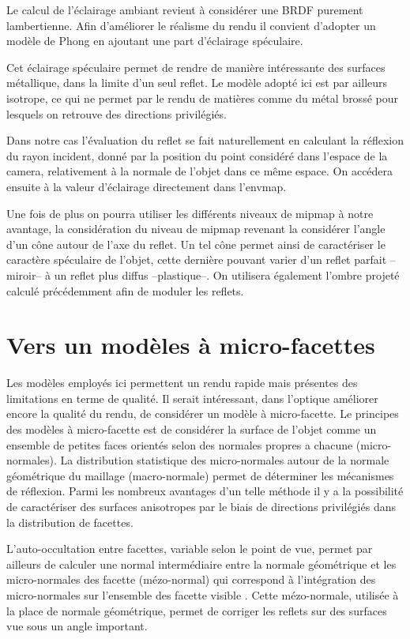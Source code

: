 \documentclass[10pt,a4paper,twoside, twocolumn]{report}
\begin{document}
Le calcul de l'éclairage ambiant revient à considérer une BRDF purement lambertienne. Afin d'améliorer le réalisme du rendu il convient d'adopter un modèle de Phong en ajoutant une part d'éclairage spéculaire.

Cet éclairage spéculaire permet de rendre de manière intéressante des surfaces métallique, dans la limite d'un seul reflet. Le modèle adopté ici est par ailleurs isotrope, ce qui ne permet par le rendu de matières comme du métal brossé pour lesquels on retrouve des directions privilégiés.

Dans notre cas l'évaluation du reflet se fait naturellement en calculant la réflexion du rayon incident, donné par la position du point considéré dans l'espace de la camera, relativement à la normale de l'objet dans ce même espace. On accédera ensuite à la valeur d'éclairage directement dans l'envmap.

Une fois de plus on pourra utiliser les différents niveaux de mipmap à notre avantage, la considération du niveau de mipmap revenant la considérer l'angle d'un cône autour de l'axe du reflet. Un tel cône permet ainsi de caractériser le caractère spéculaire de l'objet, cette dernière pouvant varier d'un reflet parfait --miroir-- à un reflet plus diffus --plastique--.
On utilisera également l'ombre projeté calculé précédemment afin de moduler les reflets.


\section{Vers un modèles à micro-facettes}

Les modèles employés ici permettent un rendu rapide mais présentes des limitations en terme de qualité. Il serait intéressant, dans l'optique améliorer encore la qualité du rendu, de considérer un modèle à micro-facette. 
Le principes des modèles à micro-facette est de considérer la surface de l'objet comme un ensemble de petites faces orientés selon des normales propres a chacune (micro-normales). La distribution statistique des micro-normales autour de la normale géométrique du maillage (macro-normale) permet de déterminer les mécanismes de réflexion. Parmi les nombreux avantages d'un telle méthode il y a la possibilité de caractériser des surfaces anisotropes par le biais de directions privilégiés dans la distribution de facettes.

L'auto-occultation entre facettes, variable selon le point de vue, permet par ailleurs de calculer une normal intermédiaire entre la normale géométrique et les micro-normales des facette (mézo-normal) qui correspond à l’intégration des micro-normales sur l'ensemble des facette visible\cite{Bruneton2010}\cite{Heitz2013} . Cette mézo-normale, utilisée à la place de normale géométrique, permet de corriger les reflets sur des surfaces vue sous un angle important.
\end{document}
